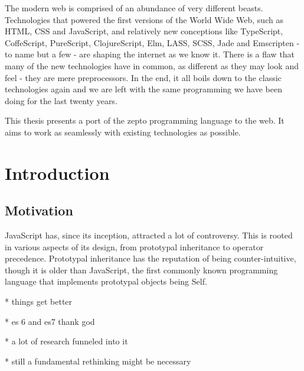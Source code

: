 \documentclass[oneside,11pt,xetex]{scrbook}
\begin{document}
\begin{onehalfspace}


The modern web is comprised of an abundance of very different beasts. Technologies that powered the first versions of the World Wide Web, such as HTML, CSS and JavaScript, and relatively new conceptions like TypeScript, CoffeScript, PureScript, ClojureScript, Elm, LASS, SCSS, Jade and Emscripten - to name but a few - are shaping the internet as we know it. There is a flaw that many of the new technologies have in common, as different as they may look and feel - they are mere preprocessors. In the end, it all boils down to the classic technologies again and we are left with the same programming we have been doing for the last twenty years.

This thesis presents a port of the zepto programming language to the web. It aims to work as seamlessly with existing technologies as possible.

\tableofcontents

\printglossary[type=\acronymtype,title=Abbreviations]

\mainmatter

\pagestyle{headings}

\chapter{Introduction}
\label{chap:intro}

\section{Motivation}

JavaScript has, since its inception, attracted a lot of controversy. This is rooted
in various aspects of its design, from prototypal inheritance to operator precedence.
Prototypal inheritance has the reputation of being counter-intuitive, though it is older
than JavaScript, the first commonly known programming language that implements prototypal
objects being Self.


* things get better

* es 6 and es7 thank god

* a lot of research funneled into it

* still a fundamental rethinking might be necessary


\end{onehalfspace}
\end{document}
